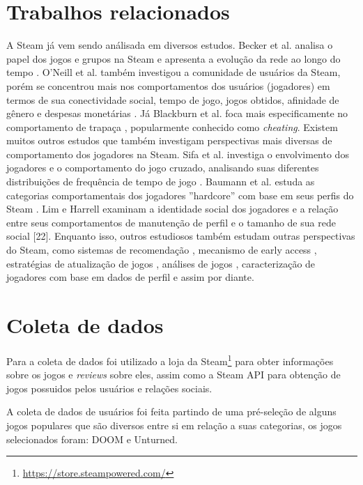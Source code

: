 \documentclass[12pt]{article}
\begin{document}
\section{Trabalhos relacionados} \label{sec:firstpage}

A Steam já vem sendo análisada em diversos estudos. Becker et al. analisa o papel dos jogos e grupos na Steam e apresenta a evolução da rede ao longo do tempo \cite{becker2012analysis}. O'Neill et al. também investigou a comunidade de usuários da Steam, porém se concentrou mais nos comportamentos dos usuários (jogadores) em termos de sua conectividade social, tempo de jogo, jogos obtidos, afinidade de gênero e despesas monetárias \cite{o2016condensing}. Já Blackburn et al. foca mais especificamente no comportamento de trapaça \cite{blackburn2011cheaters}, popularmente conhecido como \textit{cheating}. Existem muitos outros estudos que também investigam perspectivas mais diversas de comportamento dos jogadores na Steam. Sifa et al. investiga o envolvimento dos jogadores e o comportamento do jogo cruzado, analisando suas diferentes distribuições de frequência de tempo de jogo \cite{sifa2014playtime,sifa2015large}. Baumann et al. estuda as categorias comportamentais dos jogadores ''hardcore'' com base em seus perfis do Steam \cite{baumann2018hardcore}. Lim e Harrell examinam a identidade social dos jogadores e a relação entre seus comportamentos de manutenção de perfil e o tamanho de sua rede social [22]. Enquanto isso, outros estudiosos também estudam outras perspectivas do Steam, como sistemas de recomendação \cite{bertens2018machine}, mecanismo de early access \cite{lin2018empirical}, estratégias de atualização de jogos \cite{lin2017studying}, análises de jogos \cite{lin2019empirical}, caracterização de jogadores com base em dados de perfil \cite{li2019statistical} e assim por diante.

\section{Coleta de dados}

Para a coleta de dados foi utilizado a loja da Steam\footnote{\url{https://store.steampowered.com/}\label{fn:steamstore}} para obter informações sobre os jogos e \textit{reviews} sobre eles, assim como a Steam API para obtenção de jogos possuidos pelos usuários e relações sociais.

A coleta de dados de usuários foi feita partindo de uma pré-seleção de alguns jogos populares que são diversos entre si em relação a suas categorias, os jogos selecionados foram: DOOM e Unturned.
\end{document}
